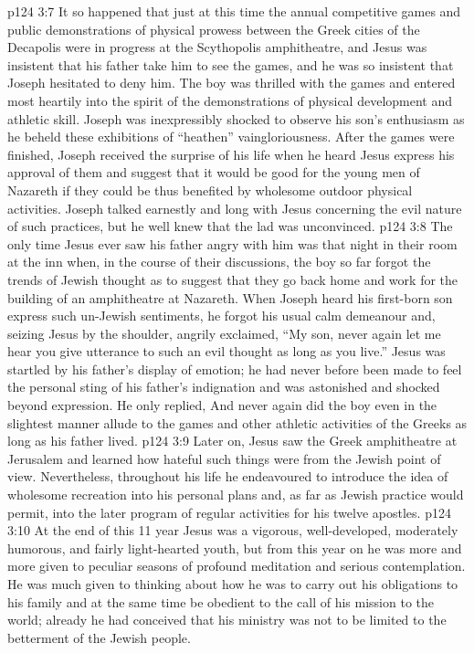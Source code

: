 \vs p124 3:7 It so happened that just at this time the annual competitive games and public demonstrations of physical prowess between the Greek cities of the Decapolis were in progress at the Scythopolis amphitheatre, and Jesus was insistent that his father take him to see the games, and he was so insistent that Joseph hesitated to deny him. The boy was thrilled with the games and entered most heartily into the spirit of the demonstrations of physical development and athletic skill. Joseph was inexpressibly shocked to observe his son’s enthusiasm as he beheld these exhibitions of “heathen” vaingloriousness. After the games were finished, Joseph received the surprise of his life when he heard Jesus express his approval of them and suggest that it would be good for the young men of Nazareth if they could be thus benefited by wholesome outdoor physical activities. Joseph talked earnestly and long with Jesus concerning the evil nature of such practices, but he well knew that the lad was unconvinced.
\vs p124 3:8 The only time Jesus ever saw his father angry with him was that night in their room at the inn when, in the course of their discussions, the boy so far forgot the trends of Jewish thought as to suggest that they go back home and work for the building of an amphitheatre at Nazareth. When Joseph heard his first\hyp{}born son express such un\hyp{}Jewish sentiments, he forgot his usual calm demeanour and, seizing Jesus by the shoulder, angrily exclaimed, “My son, never again let me hear you give utterance to such an evil thought as long as you live.” Jesus was startled by his father’s display of emotion; he had never before been made to feel the personal sting of his father’s indignation and was astonished and shocked beyond expression. He only replied,  And never again did the boy even in the slightest manner allude to the games and other athletic activities of the Greeks as long as his father lived.
\vs p124 3:9 Later on, Jesus saw the Greek amphitheatre at Jerusalem and learned how hateful such things were from the Jewish point of view. Nevertheless, throughout his life he endeavoured to introduce the idea of wholesome recreation into his personal plans and, as far as Jewish practice would permit, into the later program of regular activities for his twelve apostles.
\vs p124 3:10 At the end of this 11 year Jesus was a vigorous, well\hyp{}developed, moderately humorous, and fairly light\hyp{}hearted youth, but from this year on he was more and more given to peculiar seasons of profound meditation and serious contemplation. He was much given to thinking about how he was to carry out his obligations to his family and at the same time be obedient to the call of his mission to the world; already he had conceived that his ministry was not to be limited to the betterment of the Jewish people.
